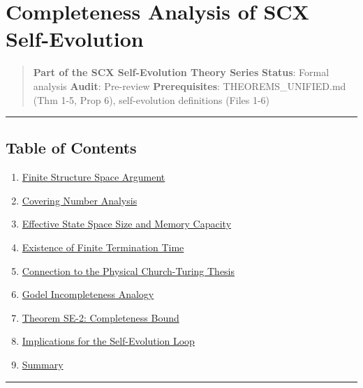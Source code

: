 \documentclass[
  12pt,
]{ctexart}
\author{SCX}
\date{2026}
\providecommand{\tightlist}{%
  \setlength{\itemsep}{0pt}\setlength{\parskip}{0pt}}
\begin{document}
\section{Completeness Analysis of SCX
Self-Evolution}\label{completeness-analysis-of-scx-self-evolution}

\begin{quote}
\textbf{Part of the SCX Self-Evolution Theory Series} \textbf{Status}:
Formal analysis \textbar{} \textbf{Audit}: Pre-review
\textbf{Prerequisites}: THEOREMS\_UNIFIED.md (Thm 1-5, Prop 6),
self-evolution definitions (Files 1-6)
\end{quote}

\begin{center}\rule{0.5\linewidth}{0.5pt}\end{center}

\subsection{Table of Contents}\label{table-of-contents}

\begin{enumerate}
\def\labelenumi{\arabic{enumi}.}
\tightlist
\item
  \hyperref[1-finite-structure-space-argument]{Finite Structure Space
  Argument}
\item
  \hyperref[2-covering-number-analysis]{Covering Number Analysis}
\item
  \hyperref[3-effective-state-space-size-and-memory-capacity]{Effective
  State Space Size and Memory Capacity}
\item
  \hyperref[4-existence-of-finite-termination-time]{Existence of Finite
  Termination Time}
\item
  \hyperref[5-connection-to-the-physical-church-turing-thesis]{Connection
  to the Physical Church-Turing Thesis}
\item
  \hyperref[6-godel-incompleteness-analogy]{Godel Incompleteness
  Analogy}
\item
  \hyperref[7-theorem-se-2-completeness-bound]{Theorem SE-2:
  Completeness Bound}
\item
  \hyperref[8-implications-for-the-self-evolution-loop]{Implications for
  the Self-Evolution Loop}
\item
  \hyperref[9-summary]{Summary}
\end{enumerate}

\begin{center}\rule{0.5\linewidth}{0.5pt}\end{center}
\end{document}
